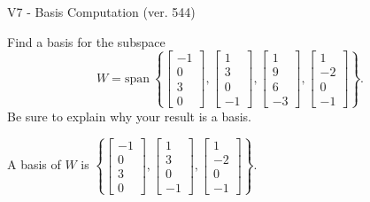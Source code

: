 \begin{exercise}
  \begin{exerciseTitle}V7 - Basis Computation (ver. 544)\end{exerciseTitle}
  \begin{exerciseStatement}
    Find a basis for the subspace 
\[W=\mathrm{span}\ \left\{\left[\begin{array}{r}
-1 \\
0 \\
3 \\
0
\end{array}\right] , \left[\begin{array}{r}
1 \\
3 \\
0 \\
-1
\end{array}\right] , \left[\begin{array}{r}
1 \\
9 \\
6 \\
-3
\end{array}\right] , \left[\begin{array}{r}
1 \\
-2 \\
0 \\
-1
\end{array}\right]\right\}.\]
 Be sure to explain why your result is a basis.


  \end{exerciseStatement}
  \begin{exerciseAnswer}
   A basis of \(W\) is  \(\left\{\left[\begin{array}{r}
-1 \\
0 \\
3 \\
0
\end{array}\right] , \left[\begin{array}{r}
1 \\
3 \\
0 \\
-1
\end{array}\right] , \left[\begin{array}{r}
1 \\
-2 \\
0 \\
-1
\end{array}\right]\right\}\).
  


  \end{exerciseAnswer}
\end{exercise}